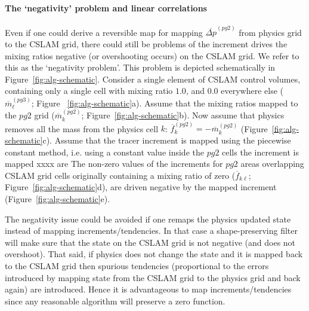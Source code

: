 \paragraph{The `negativity' problem and linear correlations} 
Even if one could derive a reversible map for mapping ${\overline{\Delta p}}^{(pg2)}$ from physics grid to the CSLAM grid, there could still be problems of the increment drives the mixing ratios negative (or overshooting occurs) on the CSLAM grid. We refer to this as the `negativity problem'. This problem is depicted schematically in Figure~\ref{fig:alg-schematic}. Consider a single element of CSLAM control volumes, containing only a single cell with mixing ratio $1.0$, and $0.0$ everywhere else ($\overline{m}^{(pg3)}_\ell$; Figure ~\ref{fig:alg-schematic}a). Assume that the mixing ratios mapped to the $pg2$ grid ($\overline{m}^{(pg2)}_k$; Figure~\ref{fig:alg-schematic}b). Now assume that physics removes all the mass from the physics cell $k$: $\overline{f}^{(pg2)}_k=-\overline{m}^{(pg2)}_k$ (Figure~\ref{fig:alg-schematic}c). Assume that the tracer increment is mapped using the piecewise constant method, i.e. using a constant value inside the $pg2$ cells the increment is mapped xxxx are The non-zero values of the increments for $pg2$ areas overlapping CSLAM grid cells originally containing a mixing ratio of zero ($\overline{f}_{k\ell}$; Figure~\ref{fig:alg-schematic}d), are driven negative by the mapped increment (Figure~\ref{fig:alg-schematic}e). 

The negativity issue could be avoided if one remaps the physics updated state instead of mapping increments/tendencies. In that case a shape-preserving filter will make sure that the state on the CSLAM grid is not negative (and does not overshoot). That said, if physics does not change the state and it is mapped back to the CSLAM grid then spurious tendencies (proportional to the errors introduced by mapping state from the CSLAM grid to the physics grid and back again) are introduced. Hence it is advantageous to map increments/tendencies since any reasonable algorithm will preserve a zero function.


